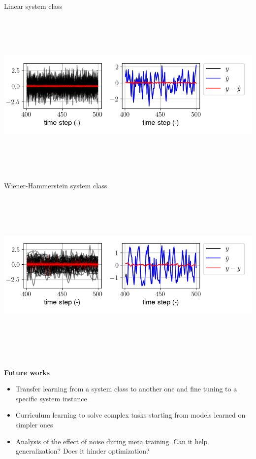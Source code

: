 \documentclass[a0,portrait]{a0poster}
\newcommand{\structure}[1]{{\color{structurecol}#1}}
\begin{document}
\begin{multicols}{2}
\begin{center}
\vspace{2cm}
Linear system class\\
\includegraphics[height=9cm]{figures/lin_sim_batch_single.png}\\
Wiener-Hammerstein system class\\
\includegraphics[height=9cm]{figures/wh_sim_batch_single.png}\\
\end{center}
\end{multicols}

\begin{center}
{\large \textbf{\structure{Future works}} \\[0.3cm]}
\end{center}
\begin{itemize}
\item \structure{Transfer learning}  from a system class to another one and \structure{fine tuning} to a specific system instance
\item \structure{Curriculum learning} to solve complex tasks starting from models learned on simpler ones%
\item Analysis of the effect of \structure{noise} during meta training. Can it help generalization?
Does it hinder optimization? 
\end{itemize}
\end{document}
